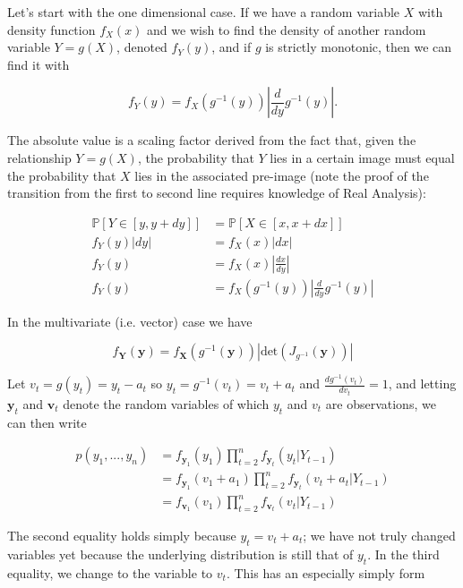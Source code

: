 \documentclass{tufte-book}
\begin{document}
\begin{aside}
    Let's start with the one dimensional case. If we have a random variable $X$ with density function $f_X(x)$ and we wish to find the density of another random variable $Y = g(X)$, denoted $f_Y(y)$, and if $g$ is strictly monotonic, then we can find it with

    \[
    f_Y(y) = f_X(g^{-1}(y)) \left| \frac{d}{dy} g^{-1}(y) \right|.
    \]

    The absolute value is a scaling factor derived from the fact that, given the relationship $Y = g(X)$, the probability that $Y$ lies in a certain image must equal the probability that $X$ lies in the associated pre-image (note the proof of the transition from the first to second line requires knowledge of Real Analysis):

    \begin{align*}
    \mathbb{P}[Y \in [y, y+dy]] &= \mathbb{P}[X\in[x, x+dx]] \\
    f_Y(y)|dy| &= f_X(x)|dx| \\
    f_Y(y) &= f_X(x) \left| \frac{dx}{dy} \right| \\
    f_Y(y) &= f_X(g^{-1}(y)) \left| \frac{d}{dy} g^{-1}(y) \right| 
    \end{align*}

    In the multivariate (i.e. vector) case we have

    \[
    f_{\bm{Y}}(\bm{y}) = f_{\bm{X}}(g^{-1}(\bm{y})) \left| \text{det}(J_{g^{-1}}(\bm{y}))\right|
    \]
\end{aside}

Let $v_t = g(y_t) = y_t - a_t$ so $y_t = g^{-1}(v_t) = v_t + a_t$ and $\frac{d g^{-1}(v_t)}{d v_t} = 1$, and letting $\bm{y}_t$ and $\bm{v}_t$ denote the random variables of which $y_t$ and $v_t$ are observations, we can then write 

\begin{align*}
p(y_1, ..., y_n) &= f_{\bm{y}_1}(y_1) \prod_{t=2}^n f_{\bm{y}_t} (y_t | Y_{t-1}) \\
&= f_{\bm{y}_1}(v_1 + a_1) \prod_{t=2}^n f_{\bm{y}_t} (v_t + a_t | Y_{t-1}) \\
&= f_{\bm{v}_1}(v_1) \prod_{t=2}^n f_{\bm{v}_t} (v_t| Y_{t-1})
\end{align*}

The second equality holds simply because $y_t = v_t + a_t$; we have not truly changed variables yet because the underlying distribution is still that of $y_t$. In the third equality, we change to the variable to $v_t$. This has an especially simply form
\end{document}
